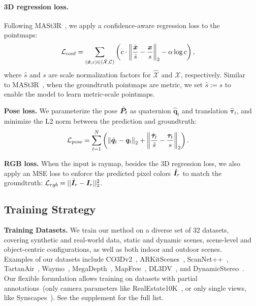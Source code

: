 \paragraph{3D regression loss.} Following MASt3R~\cite{leroy2024mast3r}, we apply a confidence-aware regression loss to the pointmaps:
\begin{equation}
\small
    \mathcal{L}_\text{conf} = \sum_{(\hat{\bm x}, c)\in ( \mathcal{\hat{X}}, \mathcal{C})} \left(c\cdot \left\|\frac{\hat{\bm x}}{\hat s} - \frac{\bm x}{s}\right\|_2 - \alpha \log c\right), 
    \vspace{-.5em}
\end{equation}
where $\hat{s}$ and $s$ are scale normalization factors for  $\mathcal{\hat{X}}$ and $\mathcal{X}$, respectively. Similar to MASt3R~\cite{leroy2024mast3r}, when the groundtruth pointmaps are metric, we set $\hat{s}:=s$ to enable the model to learn metric-scale pointmaps. 

\noindent\textbf{Pose loss.} We parameterize the pose $\hat{\bm P}_t$ as quaternion $\hat{\bm q}_t$ and translation $\hat{\bm \tau}_t$, and minimize the L2 norm between the prediction and groundtruth:
\begin{equation}
\small
    \mathcal{L}_\text{pose} = \sum_{t=1}^N
    \left( \left\|\hat{\bm q}_t - \bm q_t\right\|_2 + \left\| \frac{\hat{\bm \tau}_t}{\hat{s}} - \frac{{\bm \tau}_t}{s} \right\|_2 \right).
\end{equation}

\noindent\textbf{RGB loss.} When the input is raymap, besides the 3D regression loss, we also apply an MSE loss to enforce the predicted pixel colors $\hat{\bm I}_r$ to match the groundtruth: $\mathcal{L}_{rgb} = ||\hat{\bm I}_r - {\bm I}_r||_2^2$.

\subsection{Training Strategy}
\noindent\textbf{Training Datasets.} We train our method on a diverse set of 32 datasets, covering synthetic and real-world data, static and dynamic scenes, scene-level and object-centric configurations, as well as both indoor and outdoor scenes. Examples of our datasets include CO3Dv2~\cite{reizenstein21co3d}, ARKitScenes~\cite{dehghan2021arkitscenes}, ScanNet++~\cite{yeshwanth2023scannet++}, TartanAir~\cite{tartanair2020iros}, Waymo~\cite{Sun_2020_CVPR}, MegaDepth~\cite{MDLi18}, MapFree~\cite{arnold2022mapfree},
DL3DV~\cite{ling2024dl3dv}, and DynamicStereo~\cite{karaev2023dynamicstereo}. Our flexible formulation allows training on datasets with partial annotations~(\ie only camera parameters like RealEstate10K~\cite{realestate10k}, or only single views, like Synscapes~\cite{wrenninge2018synscapes}). See the supplement for the full list. %



